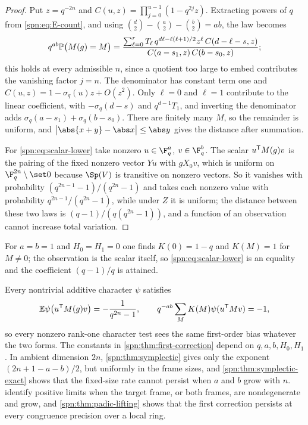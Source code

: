 \begin{proof}
Put $z=q^{-2n}$ and $C(u,z)=\prod_{j=0}^{u-1}(1-q^{2j}z)$. Extracting powers of
$q$ from \eqref{spn:eq:E-count}, and using
$\binom d2-\binom a2-\binom b2=ab$, the law becomes
\[
 q^{ab}\mathbb{P}\bigl(M(g)=M\bigr)=\frac{\sum_{\ell=0}^rT_\ell\,
 q^{d\ell-\ell(\ell+1)/2}z^\ell\,C(d-\ell-s,z)}{C(a-s_1,z)\,C(b-s_0,z)} ;
\]
this holds at every admissible $n$, since a quotient too large to embed
contributes the vanishing factor $j=n$. The denominator has constant term one
and $C(u,z)=1-\sigma_q(u)z+O(z^2)$. Only $\ell=0$ and $\ell=1$ contribute to the
linear coefficient, with $-\sigma_q(d-s)$ and $q^{d-1}T_1$, and inverting the
denominator adds $\sigma_q(a-s_1)+\sigma_q(b-s_0)$. There are finitely many
$M$, so the remainder is uniform, and $\bigl|\abs{x+y}-\abs x\bigr|\le\abs y$
gives the distance after summation.

For \eqref{spn:eq:scalar-lower} take nonzero $u\in\F_q^a$, $v\in\F_q^b$. The
scalar $u^{\mathsf{T}}M(g)v$ is the pairing of the fixed nonzero vector $Yu$ with
$gX_0v$, which is uniform on $\F_q^{2n}\setminus\set0$ because $\Sp(V)$ is
transitive on nonzero vectors. So it vanishes with probability
$(q^{2n-1}-1)/(q^{2n}-1)$ and takes each nonzero value with probability
$q^{2n-1}/(q^{2n}-1)$, while under $Z$ it is uniform; the distance between these
two laws is $(q-1)/(q(q^{2n}-1))$, and a function of an observation cannot
increase total variation.
\end{proof}

For $a=b=1$ and $H_0=H_1=0$ one finds $K(0)=1-q$ and $K(M)=1$ for $M\ne0$; the
observation is the scalar itself, so \eqref{spn:eq:scalar-lower} is an
equality and the coefficient $(q-1)/q$ is attained.

Every nontrivial additive character $\psi$ satisfies
\[
 \mathbb{E}\psi\bigl(u^{\mathsf{T}}M(g)v\bigr)=-\frac1{q^{2n}-1},\qquad
 q^{-ab}\sum_MK(M)\psi(u^{\mathsf{T}}Mv)=-1,
\]
so every nonzero rank-one character
test sees the same first-order bias whatever the two forms. The constants in
\cref{spn:thm:first-correction} depend on $q,a,b,H_0,H_1$. In ambient
dimension $2n$, \cref{spn:thm:symplectic} gives only the exponent
$(2n+1-a-b)/2$, but uniformly in the frame sizes, and
\cref{spn:thm:symplectic-exact} shows that the fixed-size rate cannot persist
when $a$ and $b$ grow with $n$. 
identify positive limits when the target frame, or both frames, are
nondegenerate and grow, and \cref{spn:thm:padic-lifting} shows that the first
correction persists at every congruence precision over a local ring.

